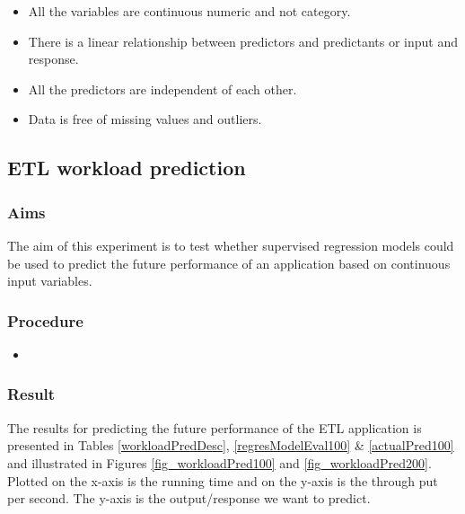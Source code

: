 \documentclass[12pt, letterpaper, titlepage]{report}
\begin{document}
\begin{itemize}
	\item All the variables are continuous numeric and not category.
	\item There is a linear relationship between predictors and predictants or input and response.
	\item All the predictors are independent of each other.
	\item Data is free of missing values and outliers.
\end{itemize}

\subsection{ETL workload prediction}
\subsubsection{Aims}
The aim of this experiment is to test whether supervised regression models could be used to predict the future performance of an application based on continuous input variables. 

\subsubsection{Procedure}

\begin{itemize}
	\item 
\end{itemize}

\subsubsection{Result} 
The results for predicting the future performance of the ETL application is presented in Tables \ref{workloadPredDesc}, \ref{regresModelEval100} \& \ref{actualPred100} and illustrated in Figures \ref{fig_workloadPred100} and \ref{fig_workloadPred200}. Plotted on the x-axis is the running time and on the y-axis is the through put per second. The y-axis is the output/response we want to predict.
\end{document}
